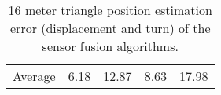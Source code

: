 \begin{table}[H]
\begin{center}
{\begin{tabular}[t]{lcccc}
                \hline
                Average          & 6.18                    & 12.87                  & 8.63            & 17.98
            \end{tabular}
        }
        \caption{16 meter triangle position estimation error (displacement and turn) of the sensor fusion algorithms. }
        \label{tab:16_triangle}
    \end{center}
\end{table}